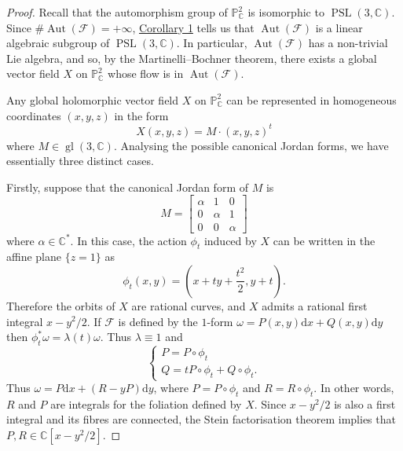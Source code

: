 \documentclass[british]{article}
\newcommand{\oldpage}[1]{\marginpar{\footnotesize$\Big\vert$ \textit{p.~#1}}}
\begin{document}
\begin{proof}
Recall that the automorphism group of \(\mathbb{P}_\mathbb{C}^2\) is
isomorphic to \(\operatorname{PSL}(3,\mathbb{C})\). Since
\(\#\operatorname{Aut}({\mathcal{F}})=+\infty\),
\hyperref[corollary-1]{Corollary 1} tells us that
\(\operatorname{Aut}({\mathcal{F}})\) is a linear algebraic subgroup of
\(\operatorname{PSL}(3,\mathbb{C})\). In particular,
\(\operatorname{Aut}({\mathcal{F}})\) has a non-trivial Lie algebra, and
so, by the Martinelli--Bochner theorem, there exists a global vector
field \(X\) on \(\mathbb{P}_\mathbb{C}^2\) whose flow is in
\(\operatorname{Aut}({\mathcal{F}})\).

Any global holomorphic vector field \(X\) on \(\mathbb{P}_\mathbb{C}^2\)
can be represented in homogeneous coordinates \((x,y,z)\) in the form \[
  X(x,y,z)
  = M\cdot(x,y,z)^t
\] where \(M\in\operatorname{gl}(3,\mathbb{C})\). Analysing the possible
canonical Jordan forms, we have essentially three distinct cases.

Firstly, suppose that the canonical Jordan form of \(M\) is \[
  M
  = \begin{bmatrix}
    \alpha & 1 & 0
  \\0 & \alpha & 1
  \\0 & 0 & \alpha
  \end{bmatrix}
\] where \(\alpha\in\mathbb{C}^*\). In this case, the action \(\phi_t\)
induced by \(X\) can be written in the affine plane \(\{z=1\}\) as \[
  \phi_t(x,y)
  = (x+ty+\frac{t^2}{2}, y+t).
\] \oldpage{53} Therefore the orbits of \(X\) are rational curves, and
\(X\) admits a rational first integral \(x-y^2/2\). If \({\mathcal{F}}\)
is defined by the \(1\)-form
\(\omega=P(x,y)\mathrm{d}{x}+Q(x,y)\mathrm{d}{y}\) then
\(\phi_t^*\omega=\lambda(t)\omega\). Thus \(\lambda\equiv1\) and \[
  \begin{cases}
    P = P\circ\phi_t
  \\Q = tP\circ\phi_t + Q\circ\phi_t.
  \end{cases}
\] Thus \(\omega=P\mathrm{d}{x}+(R-yP)\mathrm{d}{y}\), where
\(P=P\circ\phi_t\) and \(R=R\circ\phi_t\). In other words, \(R\) and
\(P\) are integrals for the foliation defined by \(X\). Since
\(x-y^2/2\) is also a first integral and its fibres are connected, the
Stein factorisation theorem \autocite{8} implies that
\(P,R\in\mathbb{C}[x-y^2/2]\).


\end{proof}
\end{document}
